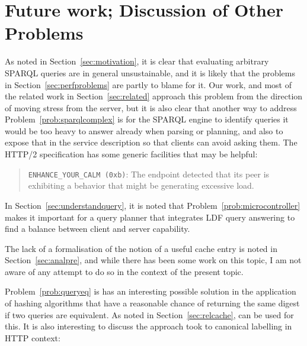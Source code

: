 

\section[Future Work]{Future work; Discussion of Other Problems}\label{sec:future}

As noted in Section~\ref{sec:motivation}, it is clear that evaluating
arbitrary SPARQL queries are in general unsustainable, and it is
likely that the problems in Section~\ref{sec:perfproblems} are partly
to blame for it. Our work, and most of the related work in
Section~\ref{sec:related} approach this problem from the direction of
moving stress from the server, but it is also clear that another way
to address Problem~\ref{prob:sparqlcomplex} is for the SPARQL engine
to identify queries it would be too heavy to answer already when
parsing or planning, and also to expose that in the service description
so that clients can avoid asking them. The HTTP/2 specification
\cite{rfc7540} has some generic facilities that may be helpful: 

\begin{quote}
\texttt{ENHANCE\_YOUR\_CALM (0xb)}:  The endpoint detected that its peer is
      exhibiting a behavior that might be generating excessive load.
\end{quote}

In Section~\ref{sec:understandquery}, it is noted that
Problem~\ref{prob:microcontroller} makes it important for a query
planner that integrates LDF query answering to find a balance between
client and server capability.

The lack of a formalisation of the notion of a useful cache entry is
noted in Section~\ref{sec:analpre}, and while there has been some work
on this topic, I am not aware of any attempt to do so in the context
of the present topic.


Problem~\ref{prob:queryeq} is has an interesting possible solution in
the application of hashing algorithms that have a reasonable chance of
returning the same digest if two queries are equivalent. As noted in
Section~\ref{sec:relcache}, \cite{kaseicache} can be used for this. It
is also interesting to discuss the approach \cite{papailiou2015graph}
took to canonical labelling in HTTP context:

